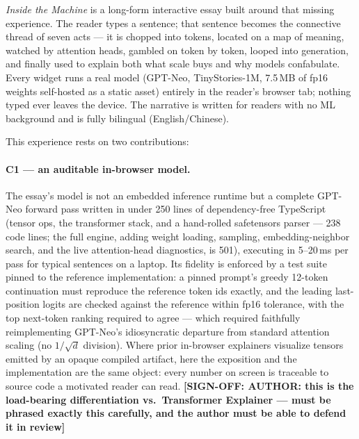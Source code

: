 \documentclass[letterpaper]{article}
\newcommand{\signoff}[1]{{\color{red!75!black}\bfseries [SIGN-OFF: #1]}}
\newcommand{\signoff}[1]{}
\begin{document}
\emph{Inside the Machine} is a long-form interactive essay built around
that missing experience. The reader types a sentence; that sentence
becomes the connective thread of seven acts --- it is chopped into
tokens, located on a map of meaning, watched by attention heads,
gambled on token by token, looped into generation, and finally used to
explain both what scale buys and why models confabulate. Every widget
runs a real model (GPT-Neo, TinyStories-1M, 7.5\,MB of fp16 weights
self-hosted as a static asset) entirely in the reader's browser tab;
nothing typed ever leaves the device. The narrative is written for
readers with no ML background and is fully bilingual (English/Chinese).

This experience rests on two contributions:

\paragraph{C1 --- an auditable in-browser model.}
The essay's model is not an embedded inference runtime but a complete
GPT-Neo forward pass written in under 250 lines of dependency-free
TypeScript (tensor ops, the transformer stack, and a hand-rolled
safetensors parser --- 238 code lines; the full engine, adding weight
loading, sampling, embedding-neighbor search, and the live
attention-head diagnostics, is 501), executing in 5--20\,ms per pass
for typical sentences on a laptop. Its fidelity is enforced by a test
suite pinned to the reference implementation: a pinned prompt's greedy
12-token continuation must reproduce the reference token ids exactly,
and the leading last-position logits are checked against the reference
within fp16 tolerance, with the top next-token ranking required to
agree --- which required faithfully reimplementing GPT-Neo's
idiosyncratic departure from standard attention scaling (no
$1/\sqrt{d}$ division). Where prior in-browser explainers visualize
tensors emitted by an opaque compiled artifact, here the exposition and
the implementation are the same object: every number on screen is
traceable to source code a motivated reader can read.
\signoff{AUTHOR: this is the load-bearing differentiation vs.\
Transformer Explainer --- must be phrased exactly this carefully, and
the author must be able to defend it in review}
\end{document}
